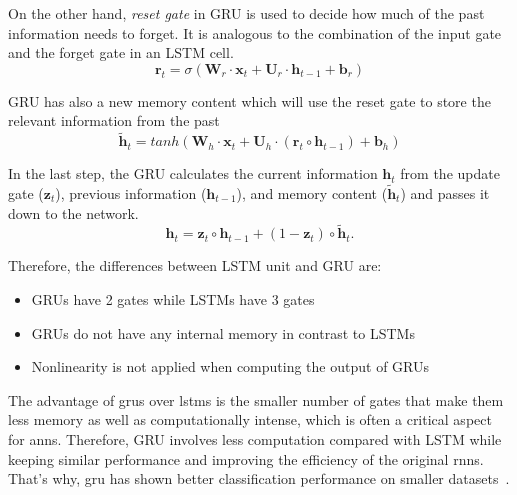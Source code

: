 On the other hand, \textit{reset gate} in GRU is used to decide how much of the past information needs to forget. It is analogous to the combination of the input gate and the forget gate in an LSTM cell.
\begin{equation}
\mathbf{r}_t = \sigma \left(\mathbf{W}_r \cdot \mathbf{x}_t + \mathbf{U}_r \cdot \mathbf{h}_{t-1} + \mathbf{b}_r\right)
\end{equation}

GRU has also a new memory content which will use the reset gate to store the relevant information from the past
\begin{equation}
\mathbf{\tilde h}_t = tanh \left(\mathbf{W}_h \cdot \mathbf{x}_t + \mathbf{U}_h \cdot (\mathbf{r}_t \circ \mathbf{h}_{t-1}) + \mathbf{b}_h\right)
\end{equation}

In the last step, the GRU calculates the current information $\mathbf{h}_t$ from the update gate ($\mathbf{z}_t$), previous information ($\mathbf{h}_{t-1}$), and memory content ($\mathbf{\tilde h}_t$) and passes it down to the network. 
\begin{equation}
\mathbf{h}_t = \mathbf{z}_t \circ \mathbf{h}_{t-1} + (1 - \mathbf{z}_t) \circ \mathbf{\tilde h}_t.
\end{equation}

Therefore, the differences between LSTM unit and GRU are:
\begin{itemize}
	\item GRUs have 2 gates while LSTMs have 3 gates
	\item GRUs do not have any internal memory in contrast to LSTMs
	\item Nonlinearity is not applied when computing the output of GRUs
\end{itemize}

The advantage of \gls{gru}s over \gls{lstm}s is the smaller number of gates that make them less memory as well as computationally intense, which is often a critical aspect for \gls{ann}s. Therefore, GRU involves less computation compared with LSTM while keeping similar performance and improving the efficiency of the original \gls{rnn}s. That's why, \gls{gru} has shown better classification performance on smaller datasets~\cite{Chung_14}.

